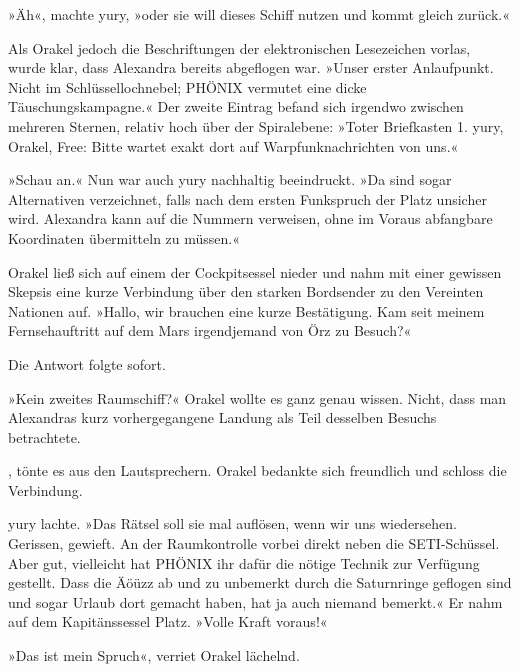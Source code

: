»Äh«, machte yury, »oder sie will dieses Schiff nutzen und kommt gleich zurück.«

Als Orakel jedoch die Beschriftungen der elektronischen Lesezeichen vorlas, wurde klar, dass Alexandra bereits abgeflogen war. »Unser erster Anlaufpunkt. Nicht im Schlüssellochnebel; PHÖNIX vermutet eine dicke Täuschungskampagne.« Der zweite Eintrag befand sich irgendwo zwischen mehreren Sternen, relativ hoch über der Spiralebene: »Toter Briefkasten 1. yury, Orakel, Free: Bitte wartet exakt dort auf Warpfunknachrichten von uns.«

»Schau an.« Nun war auch yury nachhaltig beeindruckt. »Da sind sogar Alternativen verzeichnet, falls nach dem ersten Funkspruch der Platz unsicher wird. Alexandra kann auf die Nummern verweisen, ohne im Voraus abfangbare Koordinaten übermitteln zu müssen.«

Orakel ließ sich auf einem der Cockpitsessel nieder und nahm mit einer gewissen Skepsis eine kurze Verbindung über den starken Bordsender zu den Vereinten Nationen auf. »Hallo, wir brauchen eine kurze Bestätigung. Kam seit meinem Fernsehauftritt auf dem Mars irgendjemand von Örz zu Besuch?«

Die Antwort folgte sofort. 

»Kein zweites Raumschiff?« Orakel wollte es ganz genau wissen. Nicht, dass man Alexandras kurz vorhergegangene Landung als Teil desselben Besuchs betrachtete.

, tönte es aus den Lautsprechern. Orakel bedankte sich freundlich und schloss die Verbindung.

yury lachte. »Das Rätsel soll sie mal auflösen, wenn wir uns wiedersehen. Gerissen, gewieft. An der Raumkontrolle vorbei direkt neben die SETI-Schüssel. Aber gut, vielleicht hat PHÖNIX ihr dafür die nötige Technik zur Verfügung gestellt. Dass die Äöüzz ab und zu unbemerkt durch die Saturnringe geflogen sind und sogar Urlaub dort gemacht haben, hat ja auch niemand bemerkt.« Er nahm auf dem Kapitänssessel Platz. »Volle Kraft voraus!«

»Das ist mein Spruch«, verriet Orakel lächelnd.


